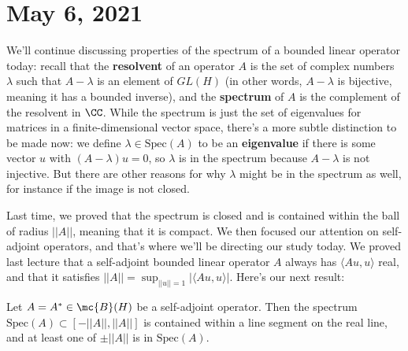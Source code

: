 
\pagebreak\section*{May 6, 2021}

We'll continue discussing properties of the spectrum of a bounded linear operator today: recall that the \textbf{resolvent} of an operator $A$ is the set of complex numbers $\lambda$ such that $A - \lambda$ is an element of $GL(H)$ (in other words, $A - \lambda$ is bijective, meaning it has a bounded inverse), and the \textbf{spectrum} of $A$ is the complement of the resolvent in $\CC$. While the spectrum is just the set of eigenvalues for matrices in a finite-dimensional vector space, there's a more subtle distinction to be made now: we define $\lambda \in \text{Spec}(A)$ to be an \textbf{eigenvalue} if there is some vector $u$ with $(A - \lambda)u = 0$, so $\lambda$ is in the spectrum because $A - \lambda$ is not injective. But there are other reasons for why $\lambda$ might be in the spectrum as well, for instance if the image is not closed. 

Last time, we proved that the spectrum is closed and is contained within the ball of radius $||A||$, meaning that it is compact. We then focused our attention on self-adjoint operators, and that's where we'll be directing our study today. We proved last lecture that a self-adjoint bounded linear operator $A$ always has $\langle Au, u \rangle$ real, and that it satisfies $||A|| = \sup_{||u|| = 1} |\langle Au, u \rangle|$. Here's our next result:

\begin{theorem}\label{spectrumisinrealline}
Let $A = A^\ast \in \mc{B}(H)$ be a self-adjoint operator. Then the spectrum $\text{Spec}(A) \subset [-||A||, ||A||]$ is contained within a line segment on the real line, and at least one of $\pm ||A||$ is in $\text{Spec}(A)$.
\end{theorem}

